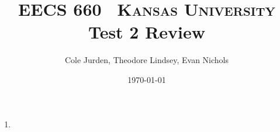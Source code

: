 \documentclass{article}
\title{
\normalfont \normalsize
\textsc{EECS 660 \ Kansas University} \\ [25pt]
\huge Test 2 Review \\ %
}
\author{Cole Jurden, Theodore Lindsey, Evan Nichols} %
\date{\normalsize\today} %
\begin{document}
\setlength{\columnsep}{1.5cm}
\setlength{\columnseprule}{0.2pt}

\maketitle %

\begin{enumerate}
\item
\end{enumerate}
\end{document}
